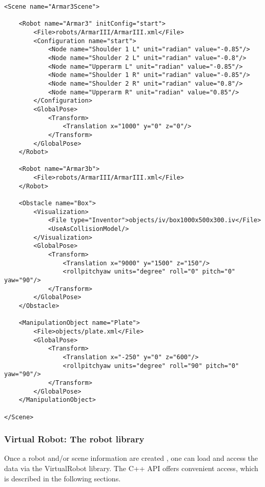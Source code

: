 \par
\begin{lstlisting}
<Scene name="Armar3Scene">

    <Robot name="Armar3" initConfig="start">
        <File>robots/ArmarIII/ArmarIII.xml</File>
        <Configuration name="start">
            <Node name="Shoulder 1 L" unit="radian" value="-0.85"/>
            <Node name="Shoulder 2 L" unit="radian" value="-0.8"/>
            <Node name="Upperarm L" unit="radian" value="-0.85"/>
            <Node name="Shoulder 1 R" unit="radian" value="-0.85"/>
            <Node name="Shoulder 2 R" unit="radian" value="0.8"/>
            <Node name="Upperarm R" unit="radian" value="0.85"/>
        </Configuration>
        <GlobalPose>
            <Transform>
                <Translation x="1000" y="0" z="0"/>
            </Transform>
        </GlobalPose>
    </Robot>

    <Robot name="Armar3b">
        <File>robots/ArmarIII/ArmarIII.xml</File>           
    </Robot>

    <Obstacle name="Box">
        <Visualization>
            <File type="Inventor">objects/iv/box1000x500x300.iv</File>
            <UseAsCollisionModel/>
        </Visualization>
        <GlobalPose>
            <Transform>
                <Translation x="9000" y="1500" z="150"/>
                <rollpitchyaw units="degree" roll="0" pitch="0" yaw="90"/>
            </Transform>
        </GlobalPose>
    </Obstacle>

    <ManipulationObject name="Plate">
        <File>objects/plate.xml</File>    
        <GlobalPose>
            <Transform>
                <Translation x="-250" y="0" z="600"/>
                <rollpitchyaw units="degree" roll="90" pitch="0" yaw="90"/>
            </Transform>
        </GlobalPose>
    </ManipulationObject>

</Scene>
\end{lstlisting}
\par
\subsubsection{Virtual Robot: The robot library}
Once a robot and/or scene information are created , one can load and access the data via the VirtualRobot library. The C++ API offers convenient access, which is described in the following sections. 
